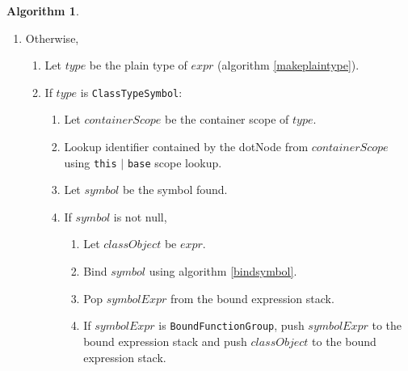 \documentclass[a4paper,oneside,11pt]{book}
\theoremstyle{definition}
\newtheorem{algo}{Algorithm}[section]
\begin{document}
\begin{algo}
\begin{itemize}
\begin{enumerate}
\begin{enumerate}
\item
Otherwise, $expr$ is \verb|BoundTypeExpression|, so
\begin{enumerate}
\item
Let $typeSymbol$ be the type symbol contained by $expr$.
\item
If $typeSymbol$ is \verb|ClassTypeSymbol| or $typeSymbol$ is \verb|EnumTypeSymbol|, set $containerSymbol$ to $typeSymbol$.
\item
Otherwise, report error.
\end{enumerate}
\item
Let $containerScope$ be the container scope of $containerSymbol$.
\item
Lookup identifier contained by the dotNode from $containerScope$ using \verb|this| $|$ \verb|base| scope lookup.
\item
Let $symbol$ be the symbol found.
\item
If $symbol$ is not null,
\begin{enumerate}
\item
Bind $symbol$ using algorithm \ref{bindsymbol}.
\end{enumerate}
\item
Otherwise, report error.
\end{enumerate}
\item
Otherwise,
\begin{enumerate}
\item
Let $type$ be the plain type of $expr$ (algorithm \ref{makeplaintype}).
\item
If $type$ is \verb|ClassTypeSymbol|:
\begin{enumerate}
\item
Let $containerScope$ be the container scope of $type$.
\item
Lookup identifier contained by the dotNode from $containerScope$ using \verb|this| $|$ \verb|base| scope lookup.
\item
Let $symbol$ be the symbol found.
\item
If $symbol$ is not null,
\begin{enumerate}
\item
Let $classObject$ be $expr$.
\item
Bind $symbol$ using algorithm \ref{bindsymbol}.
\item
Pop $symbolExpr$ from the bound expression stack.
\item
If $symbolExpr$ is \verb|BoundFunctionGroup|, push $symbolExpr$ to the bound expression stack and push $classObject$ to the bound expression stack.

\end{enumerate}
\end{enumerate}
\end{enumerate}
\end{enumerate}
\end{itemize}
\end{algo}
\end{document}
